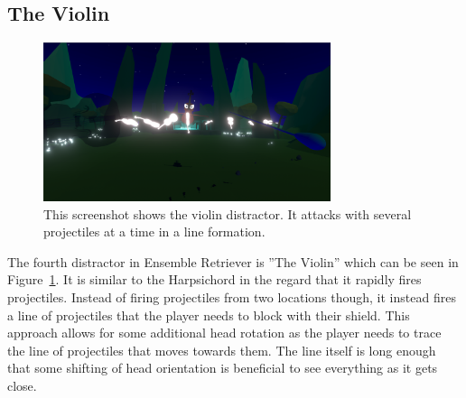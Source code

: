 \subsection{The Violin}
\begin{figure}[tbph]
    \centering
    \includegraphics[width=0.75\textwidth]{figures/screenshots/violin.png}
    \caption[The Violin Distractor]{This screenshot shows the violin distractor. It attacks with several projectiles at a time in a line formation.}
    \label{fig:violinDistractor}
\end{figure}
The fourth distractor in Ensemble Retriever is ''The Violin'' which can be seen in Figure~\ref{fig:violinDistractor}. It is similar to the Harpsichord in the regard that it rapidly fires projectiles. Instead of firing projectiles from two locations though, it instead fires a line of projectiles that the player needs to block with their shield. This approach allows for some additional head rotation as the player needs to trace the line of projectiles that moves towards them. The line itself is long enough that some shifting of head orientation is beneficial to see everything as it gets close. 

